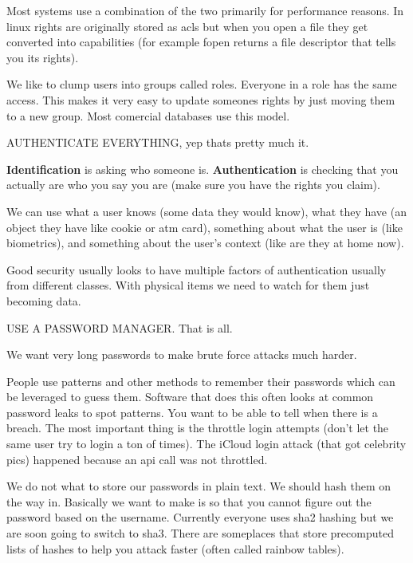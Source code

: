 \documentclass{article}
\begin{document}

Most systems use a combination of the two primarily for performance reasons. In linux rights are originally stored as acls but when you open a file they get converted into capabilities (for example fopen returns a file descriptor that tells you its rights).


We like to clump users into groups called roles. Everyone in a role has the same access. This makes it very easy to update someones rights by just moving them to a new group. Most comercial databases use this model.




AUTHENTICATE EVERYTHING, yep thats pretty much it.

\textbf{Identification} is asking who someone is. \textbf{Authentication} is checking that you actually are who you say you are (make sure you have the rights you claim).


We can use what a user knows (some data they would know), what they have (an object they have like cookie or atm card), something about what the user is (like biometrics), and something about the user's context (like are they at home now).


Good security usually looks to have multiple factors of authentication usually from different classes. With physical items we need to watch for them just becoming data. 


USE A PASSWORD MANAGER. That is all.


We want very long passwords to make brute force attacks much harder.


People use patterns and other methods to remember their passwords which can be leveraged to guess them. Software that does this often looks at common password leaks to spot patterns. You want to be able to tell when there is a breach. The most important thing is the throttle login attempts (don't let the same user try to login a ton of times). The iCloud login attack (that got celebrity pics) happened because an api call was not throttled.




We do not what to store our passwords in plain text. We should hash them on the way in. Basically we want to make is so that you cannot figure out the password based on the username. Currently everyone uses sha2 hashing but we are soon going to switch to sha3. There are someplaces that store precomputed lists of hashes to help you attack faster (often called rainbow tables).
\end{document}
